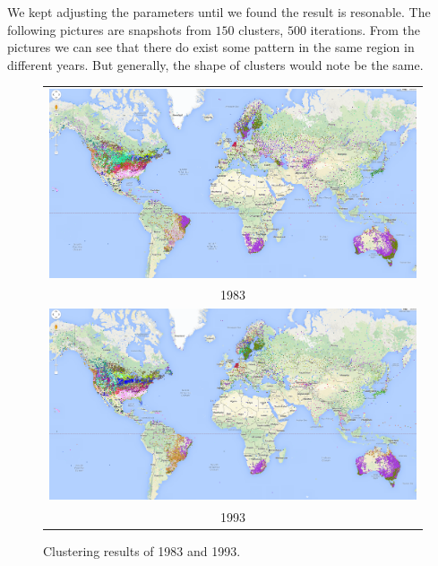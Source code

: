We kept adjusting the parameters until we found the result is resonable. The following pictures are snapshots from $150$ clusters, $500$ iterations. From the pictures we can see that there do exist some pattern in the same region in different years. But generally, the shape of clusters would note be the same.

\begin{figure}[htbp]
    \centering
    \begin{tabular}{c}
        \includegraphics[width =\linewidth]{images/1983.png}\\1983\\
        \includegraphics[width =\linewidth]{images/1993.png}\\1993\\
    \end{tabular}
    \caption{Clustering results of 1983 and 1993.}
\end{figure}

